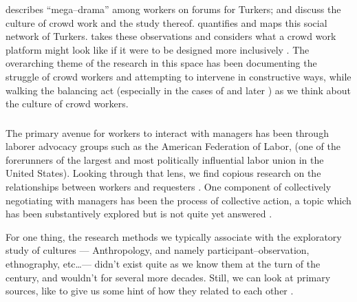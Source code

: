 \documentclass[trackingWork]{subfiles}
\begin{document}
\citeauthor{dynamo} describes ``mega--drama'' among workers on forums for Turkers;
\citeauthor{irani2015cultural} and \citeauthor{storiesIraniSilberman} discuss
the culture of crowd work and the study thereof.
\citeauthor{crowdcollab} quantifies and maps this social network of Turkers.
\citeauthor{takingAHITMcInnis} takes these observations and considers
what a crowd work platform might look like if it were to be designed more inclusively
\cite{dynamo,irani2015cultural,storiesIraniSilberman,crowdcollab,takingAHITMcInnis}.
The overarching theme of the research in this space has been
documenting the struggle of crowd workers
and attempting to intervene in constructive ways, while walking the balancing act
(especially in the cases of \citeauthor{irani2015cultural} and later \citeauthor{storiesIraniSilberman})
as we think about the culture of crowd workers.



\subsubsection{\pieceworkpers}
The primary avenue for workers to interact with managers has been through
laborer advocacy groups such as the American Federation of Labor,
(one of the forerunners of the largest and
most politically influential labor union in the United States).
Looking through that lens, we find copious research on
the relationships between workers and requesters
\cite{levi2009union,ahlquist2013interest,
      mccallum2013global,jacoby1983union}.
One component of collectively negotiating with managers has been the process
of collective action, a topic which has been substantively explored
but is not quite yet answered
\cite{russell1982collective,olsonlogic}.


For one thing, the research methods we typically associate with the exploratory study of cultures
--- Anthropology, and namely participant--observation, ethnography, etc\dots ---
didn't exist quite as we know them at the turn of the  century, and
wouldn't for several more decades.
Still, we can look at primary sources, like 
to give us some hint of how they related to each other
\cite{american1921problem}.
\end{document}
